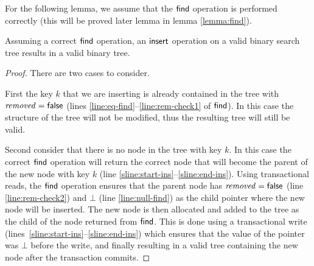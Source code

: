 For the following lemma, we assume that the $\act{find}$ operation is performed correctly (this will be proved later lemma in lemma \ref{lemma:find}).

\begin{lemma}
\label{lemma:insert-valid1}
Assuming a correct $\act{find}$ operation, an $\act{insert}$ operation on a valid binary search tree results in a valid binary tree.%
\end{lemma}
\begin{proof}
There are two cases to consider.

First the key $k$ that we are inserting is already contained in the tree with $\ms{removed}=\lit{false}$ (lines \ref{line:eq-find}--\ref{line:rem-check1} of $\act{find}$).
In this case the structure of the tree will not be modified, thus the resulting tree will still be valid.

Second consider that there is no node in the tree with key $k$.
In this case the correct $\act{find}$ operation will return the correct node that will become the parent of the new node with key $k$ (line \ref{sline:start-ins}--\ref{sline:end-ins}).
Using transactional reads, the $\act{find}$ operation ensures that the parent node has $\ms{removed}=\lit{false}$ (line \ref{line:rem-check2}) and $\bot$
(line \ref{line:null-find}) as the child pointer where the new
node will be inserted.
The new node is then allocated and added to the tree as the child of the node returned from $\act{find}$.
This is done using a transactional write (lines~\ref{sline:start-ins}--\ref{sline:end-ins}) which ensures that the value of the pointer was $\bot$ before the write,
and finally resulting in a valid tree containing the new node after the transaction commits.
\end{proof}


